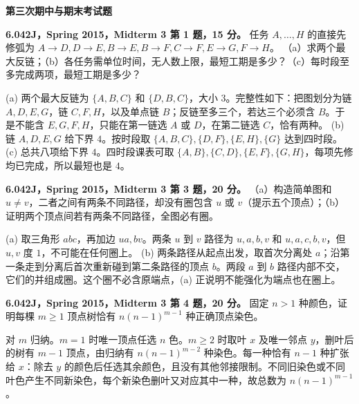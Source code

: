 \par\addvspace{7pt}\noindent\textbf{第三次期中与期末考试题}\par
\begin{exercise}\label{mit:6042-mt3-q1}
\textbf{6.042J，Spring 2015，Midterm 3 第 1 题，15 分。}
任务 $A,\ldots,H$ 的直接先修弧为 $A\to D,D\to E,B\to E,B\to F,C\to F,E\to G,F\to H$。
（a）求两个最大反链；（b）各任务需单位时间，无人数上限，最短工期是多少？（c）每时段至多完成两项，最短工期是多少？
\end{exercise}
\begin{solution}
(a) 两个最大反链为 $\{A,B,C\}$ 和 $\{D,B,C\}$，大小 $3$。完整性如下：把图划分为链 $A,D,E,G$，链 $C,F,H$，以及单点链 $B$；反链至多三个，若达三个必须含 $B$。于是不能含 $E,G,F,H$，只能在第一链选 $A$ 或 $D$，在第二链选 $C$，恰有两种。
(b) 链 $A,D,E,G$ 给下界 $4$。按时段取 $\{A,B,C\},\{D,F\},\{E,H\},\{G\}$ 达到四时段。
(c) 总共八项给下界 $4$。四时段课表可取 $\{A,B\},\{C,D\},\{E,F\},\{G,H\}$，每项先修均已完成，所以最短也是 $4$。
\end{solution}

\begin{exercise}\label{mit:6042-mt3-q3}
\textbf{6.042J，Spring 2015，Midterm 3 第 3 题，20 分。}
（a）构造简单图和 $u\ne v$，二者之间有两条不同路径，却没有圈包含 $u$ 或 $v$（提示五个顶点）；（b）证明两个顶点间若有两条不同路径，全图必有圈。
\end{exercise}
\begin{solution}
(a) 取三角形 $abc$，再加边 $ua,bv$。两条 $u$ 到 $v$ 路径为 $u,a,b,v$ 和 $u,a,c,b,v$，但 $u,v$ 度 $1$，不可能在任何圈上。
(b) 两条路径从起点出发，取首次分离处 $a$；沿第一条走到分离后首次重新碰到第二条路径的顶点 $b$。两段 $a$ 到 $b$ 路径内部不交，它们的并组成圈。这个圈不必含原端点，(a) 正说明不能强化为端点也在圈上。
\end{solution}

\begin{exercise}\label{mit:6042-mt3-q4}
\textbf{6.042J，Spring 2015，Midterm 3 第 4 题，20 分。}
固定 $n>1$ 种颜色，证明每棵 $m\ge1$ 顶点树恰有 $n(n-1)^{m-1}$ 种正确顶点染色。
\end{exercise}
\begin{solution}
对 $m$ 归纳。$m=1$ 时唯一顶点任选 $n$ 色。$m\ge2$ 时取叶 $x$ 及唯一邻点 $y$，删叶后的树有 $m-1$ 顶点，由归纳有 $n(n-1)^{m-2}$ 种染色。每一种恰有 $n-1$ 种扩张给 $x$：除去 $y$ 的颜色后任选其余颜色，且没有其他邻接限制。不同旧染色或不同叶色产生不同新染色，每个新染色删叶又对应其中一种，故总数为 $n(n-1)^{m-1}$。
\end{solution}

